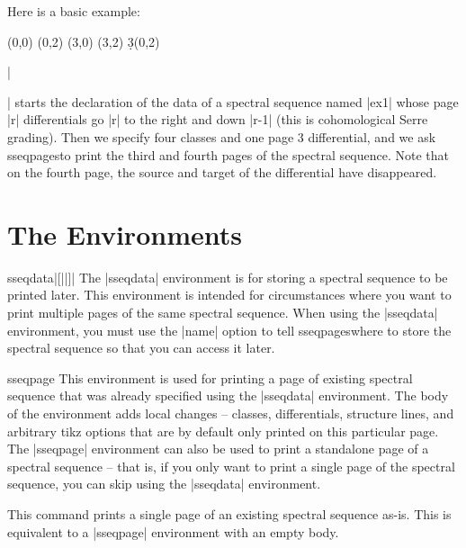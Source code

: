 \documentclass{ltxdoc}
\def\sseqpages{sseqpages}
\begin{document}
Here is a basic example:
\begin{codeexample}[]
\begin{sseqdata}[name=ex1,cohomological Serre grading]
\class(0,0)
\class(0,2)
\class(3,0)
\class(3,2)
\d3(0,2)
\end{sseqdata}
\printpage[name=ex1,page=3]\hskip1cm
\printpage[name=ex1,page=4]
\end{codeexample}
|\begin{sseqdata}[name=ex1,degree={#1}{1-#1}]| starts the declaration of the data of a spectral sequence named |ex1| whose page |r| differentials go |r| to the right and down |r-1| (this is cohomological Serre grading). Then we specify four classes and one page 3 differential, and we ask \sseqpages\space to print the third and fourth pages of the spectral sequence. Note that on the fourth page, the source and target of the differential have disappeared.

\section{The Environments}
\begin{environment}{{sseqdata}|[||]|}
The |sseqdata| environment is for storing a spectral sequence to be printed later. This environment is intended for circumstances where you want to print multiple pages of the same spectral sequence. When using the |sseqdata| environment, you must use the |name| option to tell \sseqpages\space where to store the spectral sequence so that you can access it later.
\end{environment}

\begin{environment}{{sseqpage}}
This environment is used for printing a page of existing spectral sequence that was already specified using the |sseqdata| environment. The body of the environment adds local changes -- classes, differentials, structure lines, and arbitrary tikz options that are by default only printed on this particular page. The |sseqpage| environment can also be used to print a standalone page of a spectral sequence -- that is, if you only want to print a single page of the spectral sequence, you can skip using the |sseqdata| environment.
\end{environment}

\begin{command}{}
This command prints a single page of an existing spectral sequence as-is. This is equivalent to a |sseqpage| environment with an empty body.
\end{command}



\end{sseqdata}
\end{document}
